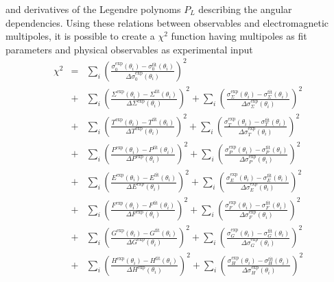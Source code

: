 \documentclass[a4paper,10pt]{article}
\begin{document}
and derivatives of the Legendre polynoms $P_L$ describing the angular dependencies. Using these relations between observables
and electromagnetic multipoles, it is possible to create a $\chi^2$ function having multipoles as fit parameters and physical
observables as experimental input
\begin{displaymath}
\begin{array}{lcl}
\chi^2
&=& \sum\limits_i \left(
\frac
{\sigma_0^\mathrm{exp}(\theta_i) - \sigma_0^\mathrm{fit}(\theta_i)}
{\Delta \sigma_0^\mathrm{exp}(\theta_i)}
\right)^2\\
&+& \sum\limits_i \left(
\frac
{\Sigma^\mathrm{exp}(\theta_i) - \Sigma^\mathrm{fit}(\theta_i)}
{\Delta \Sigma^\mathrm{exp}(\theta_i)}
\right)^2
+ \sum\limits_i \left(
\frac
{\sigma_\Sigma^\mathrm{exp}(\theta_i) - \sigma_\Sigma^\mathrm{fit}(\theta_i)}
{\Delta \sigma_\Sigma^\mathrm{exp}(\theta_i)}
\right)^2\\
&+& \sum\limits_i \left(
\frac
{T^\mathrm{exp}(\theta_i) - T^\mathrm{fit}(\theta_i)}
{\Delta T^\mathrm{exp}(\theta_i)}
\right)^2
+ \sum\limits_i \left(
\frac
{\sigma_T^\mathrm{exp}(\theta_i) - \sigma_T^\mathrm{fit}(\theta_i)}
{\Delta \sigma_T^\mathrm{exp}(\theta_i)}
\right)^2\\
&+& \sum\limits_i \left(
\frac
{P^\mathrm{exp}(\theta_i) - P^\mathrm{fit}(\theta_i)}
{\Delta P^\mathrm{exp}(\theta_i)}
\right)^2
+ \sum\limits_i \left(
\frac
{\sigma_P^\mathrm{exp}(\theta_i) - \sigma_P^\mathrm{fit}(\theta_i)}
{\Delta \sigma_P^\mathrm{exp}(\theta_i)}
\right)^2\\
&+& \sum\limits_i \left(
\frac
{E^\mathrm{exp}(\theta_i) - E^\mathrm{fit}(\theta_i)}
{\Delta E^\mathrm{exp}(\theta_i)}
\right)^2
+ \sum\limits_i \left(
\frac
{\sigma_E^\mathrm{exp}(\theta_i) - \sigma_E^\mathrm{fit}(\theta_i)}
{\Delta \sigma_E^\mathrm{exp}(\theta_i)}
\right)^2\\
&+& \sum\limits_i \left(
\frac
{F^\mathrm{exp}(\theta_i) - F^\mathrm{fit}(\theta_i)}
{\Delta F^\mathrm{exp}(\theta_i)}
\right)^2
+ \sum\limits_i \left(
\frac
{\sigma_F^\mathrm{exp}(\theta_i) - \sigma_F^\mathrm{fit}(\theta_i)}
{\Delta \sigma_F^\mathrm{exp}(\theta_i)}
\right)^2\\
&+& \sum\limits_i \left(
\frac
{G^\mathrm{exp}(\theta_i) - G^\mathrm{fit}(\theta_i)}
{\Delta G^\mathrm{exp}(\theta_i)}
\right)^2
+ \sum\limits_i \left(
\frac
{\sigma_G^\mathrm{exp}(\theta_i) - \sigma_G^\mathrm{fit}(\theta_i)}
{\Delta \sigma_G^\mathrm{exp}(\theta_i)}
\right)^2\\
&+& \sum\limits_i \left(
\frac
{H^\mathrm{exp}(\theta_i) - H^\mathrm{fit}(\theta_i)}
{\Delta H^\mathrm{exp}(\theta_i)}
\right)^2
+ \sum\limits_i \left(
\frac
{\sigma_H^\mathrm{exp}(\theta_i) - \sigma_H^\mathrm{fit}(\theta_i)}
{\Delta \sigma_H^\mathrm{exp}(\theta_i)}
\right)^2
\end{array}
\end{displaymath}
\end{document}
